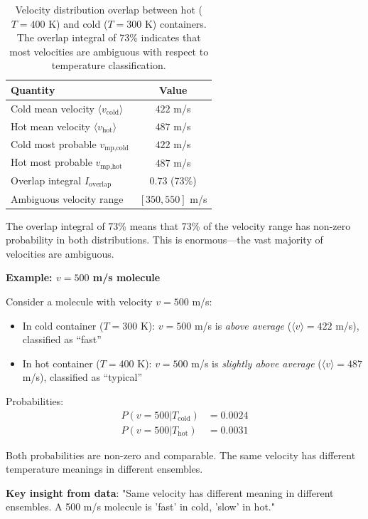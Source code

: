\documentclass[10pt,twocolumn,letterpaper]{article}
\theoremstyle{definition}
\theoremstyle{remark}
\begin{document}
\begin{table}[h]
\centering
\caption{Velocity distribution overlap between hot ($T = 400$ K) and cold ($T = 300$ K) containers. The overlap integral of 73\% indicates that most velocities are ambiguous with respect to temperature classification.}
\label{tab:velocity_overlap}
\begin{tabular}{lc}
\toprule
\textbf{Quantity} & \textbf{Value} \\
\midrule
Cold mean velocity $\langle v_{\text{cold}} \rangle$ & $422$ m/s \\
Hot mean velocity $\langle v_{\text{hot}} \rangle$ & $487$ m/s \\
Cold most probable $v_{\text{mp,cold}}$ & $422$ m/s \\
Hot most probable $v_{\text{mp,hot}}$ & $487$ m/s \\
Overlap integral $I_{\text{overlap}}$ & $0.73$ (73\%) \\
Ambiguous velocity range & $[350, 550]$ m/s \\
\bottomrule
\end{tabular}
\end{table}

The overlap integral of 73\% means that 73\% of the velocity range has non-zero probability in both distributions. This is enormous—the vast majority of velocities are ambiguous.

\textbf{Example: $v = 500$ m/s molecule}

Consider a molecule with velocity $v = 500$ m/s:
\begin{itemize}
\item In cold container ($T = 300$ K): $v = 500$ m/s is \textit{above average} ($\langle v \rangle = 422$ m/s), classified as ``fast''
\item In hot container ($T = 400$ K): $v = 500$ m/s is \textit{slightly above average} ($\langle v \rangle = 487$ m/s), classified as ``typical''
\end{itemize}

Probabilities:
\begin{align}
P(v=500 | T_{\text{cold}}) &= 0.0024 \\
P(v=500 | T_{\text{hot}}) &= 0.0031
\end{align}

Both probabilities are non-zero and comparable. The same velocity has different temperature meanings in different ensembles.

\textbf{Key insight from data}: "Same velocity has different meaning in different ensembles. A 500 m/s molecule is 'fast' in cold, 'slow' in hot."
\end{document}
